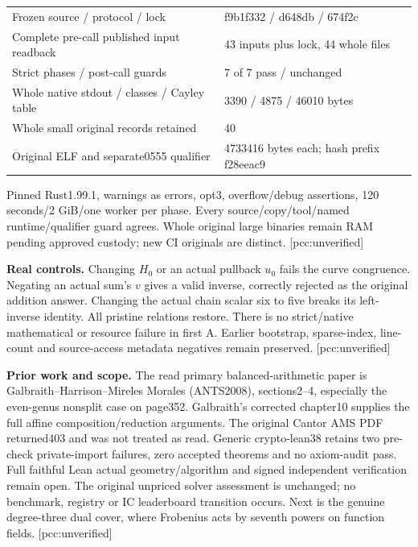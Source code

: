 \documentclass[10pt,a4paper]{article}
\begin{document}
\begin{center}\small
\begin{tabular}{ll}
\toprule
Frozen source / protocol / lock & f9b1f332 / d648db / 674f2c\\
Complete pre-call published input readback & 43 inputs plus lock, 44 whole files\\
Strict phases / post-call guards & 7 of 7 pass / unchanged\\
Whole native stdout / classes / Cayley table & 3390 / 4875 / 46010 bytes\\
Whole small original records retained & 40\\
Original ELF and separate0555 qualifier & 4733416 bytes each; hash prefix f28eeac9\\
\bottomrule
\end{tabular}\end{center}
Pinned Rust1.99.1, warnings as errors, opt3, overflow/debug assertions,
120 seconds/2 GiB/one worker per phase. Every source/copy/tool/named
runtime/qualifier guard agrees. Whole original large binaries remain
RAM pending approved custody; new CI originals are distinct.
[pcc:unverified]

\textbf{Real controls.} Changing $H_0$ or an actual pullback $u_0$ fails
the curve congruence. Negating an actual sum's $v$ gives a valid inverse,
correctly rejected as the original addition answer. Changing the actual
chain scalar six to five breaks its left-inverse identity. All pristine
relations restore. There is no strict/native mathematical or resource
failure in first A. Earlier bootstrap, sparse-index, line-count and
source-access metadata negatives remain preserved. [pcc:unverified]

\textbf{Prior work and scope.} The read primary balanced-arithmetic paper
is Galbraith--Harrison--Mireles Morales (ANTS2008), sections2--4,
especially the even-genus nonsplit case on page352. Galbraith's corrected
chapter10 supplies the full affine composition/reduction arguments.
The original Cantor AMS PDF returned403 and was not treated as read.
Generic crypto-lean38 retains two pre-check private-import failures,
zero accepted theorems and no axiom-audit pass. Full faithful Lean actual
geometry/algorithm and signed independent verification remain open.
The original unpriced solver assessment is unchanged; no benchmark,
registry or IC leaderboard transition occurs. Next is the genuine
degree-three dual cover, where Frobenius acts by seventh powers on
function fields. [pcc:unverified]
\end{document}
